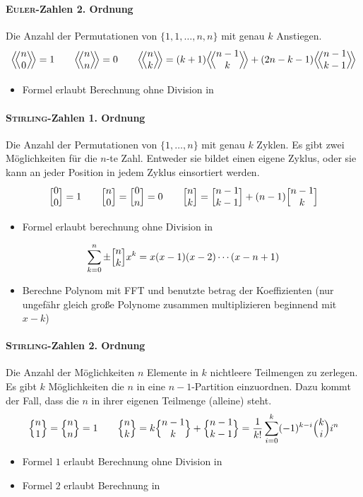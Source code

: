 \paragraph{\textsc{Euler}-Zahlen 2. Ordnung}
Die Anzahl der Permutationen von $\{1,1, \ldots, n,n\}$ mit genau $k$ Anstiegen.
\[\eulerII{n}{0} = 1 \qquad\eulerII{n}{n} = 0 \qquad\eulerII{n}{k} = (k+1) \eulerII{n-1}{k} + (2n-k-1) \eulerII{n-1}{k-1}\]
\begin{itemize}
	\item Formel erlaubt Berechnung ohne Division in 
\end{itemize}

\paragraph{\textsc{Stirling}-Zahlen 1. Ordnung}
Die Anzahl der Permutationen von $\{1, \ldots, n\}$ mit genau $k$ Zyklen.
Es gibt zwei Möglichkeiten für die $n$-te Zahl. Entweder sie bildet einen eigene Zyklus, oder sie kann an jeder Position in jedem Zyklus einsortiert werden.
\[\Bigl[ \begin{matrix} 0 \\ 0 \end{matrix} \Bigr] = 1 \qquad
\Bigl[ \begin{matrix} n \\ 0 \end{matrix} \Bigr] = \Bigl[ \begin{matrix} 0 \\ n \end{matrix} \Bigr] = 0 \qquad
\Bigl[ \begin{matrix} n \\ k \end{matrix} \Bigr] = \Bigl[ \begin{matrix} n-1 \\ k-1 \end{matrix} \Bigr] + (n-1) \Bigl[ \begin{matrix} n-1 \\ k \end{matrix} \Bigr]\]
\begin{itemize}
	\item Formel erlaubt berechnung ohne Division in 
\end{itemize}
\[\sum_{k=0}^{n}\pm\Bigl[ \begin{matrix} n \\ k \end{matrix} \Bigr]x^k=x(x-1)(x-2)\cdots(x-n+1)\]
\begin{itemize}
	\item Berechne Polynom mit FFT und benutzte betrag der Koeffizienten  (nur ungefähr gleich große Polynome zusammen multiplizieren beginnend mit $x-k$)
\end{itemize}

\paragraph{\textsc{Stirling}-Zahlen 2. Ordnung}
Die Anzahl der Möglichkeiten $n$ Elemente in $k$ nichtleere Teilmengen zu zerlegen.
Es gibt $k$ Möglichkeiten die $n$ in eine $n-1$-Partition einzuordnen.
Dazu kommt der Fall, dass die $n$ in ihrer eigenen Teilmenge (alleine) steht.
\[\Bigl\{ \begin{matrix} n \\ 1 \end{matrix} \Bigr\} = \Bigl\{ \begin{matrix} n \\ n \end{matrix} \Bigr\} = 1 \qquad
\Bigl\{ \begin{matrix} n \\ k \end{matrix} \Bigr\} = k \Bigl\{ \begin{matrix} n-1 \\ k \end{matrix} \Bigr\} + \Bigl\{ \begin{matrix} n-1 \\ k-1 \end{matrix} \Bigr\} =
\frac{1}{k!} \sum\limits_{i=0}^{k} (-1)^{k-i}\Bigl( \begin{matrix} k \\ i \end{matrix} \Bigr)i^n\]
\begin{itemize}
	\item Formel $1$ erlaubt Berechnung ohne Division in 
	\item Formel $2$ erlaubt Berechnung in 
\end{itemize}

